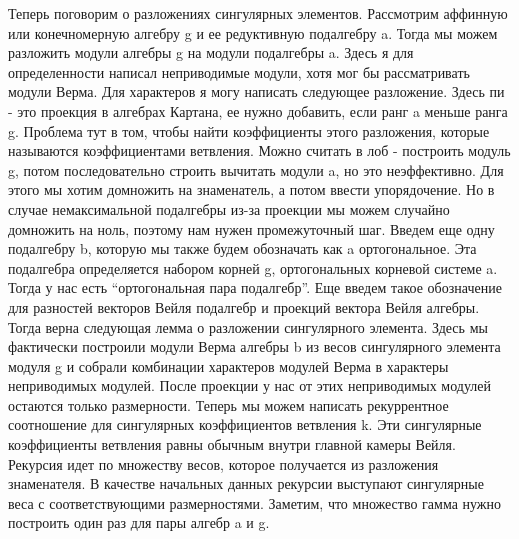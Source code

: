 \documentclass{article}
\theoremstyle{definition} \newtheorem{Def}{Определение}
\begin{document}
Теперь поговорим о разложениях сингулярных элементов. Рассмотрим аффинную или конечномерную алгебру g и ее редуктивную подалгебру a. Тогда мы можем разложить модули алгебры g на модули подалгебры a. Здесь я для определенности написал неприводимые модули, хотя мог бы рассматривать модули Верма. 
Для характеров я могу написать следующее разложение. Здесь пи - это проекция в алгебрах Картана, ее нужно добавить, если ранг a меньше ранга g. Проблема тут в том, чтобы найти коэффициенты этого разложения, которые называются коэффициентами ветвления. Можно считать в лоб - построить модуль g, потом последовательно строить вычитать модули a, но это неэффективно. 
Для этого мы хотим домножить на знаменатель, а потом ввести упорядочение. Но в случае немаксимальной подалгебры из-за проекции мы можем случайно домножить на ноль, поэтому нам нужен промежуточный шаг. Введем еще одну подалгебру b, которую мы также будем обозначать как a ортогональное. Эта подалгебра определяется набором корней g, ортогональных корневой системе a. Тогда у нас есть ``ортогональная пара подалгебр''. 
Еще введем такое обозначение для разностей векторов Вейля подалгебр и проекций вектора Вейля алгебры. 
Тогда верна следующая лемма о разложении сингулярного элемента. 
Здесь мы фактически построили модули Верма алгебры b из весов сингулярного элемента модуля g и собрали комбинации характеров модулей Верма в характеры неприводимых модулей. После проекции у нас от этих неприводимых модулей остаются только размерности. 
Теперь мы можем написать рекуррентное соотношение для сингулярных коэффициентов ветвления k. Эти сингулярные коэффициенты ветвления равны обычным внутри главной камеры Вейля. Рекурсия идет по множеству весов, которое получается из разложения знаменателя. В качестве начальных данных рекурсии выступают сингулярные веса с соответствующими размерностями. Заметим, что множество гамма нужно построить один раз для пары алгебр a и g.
\end{document}
